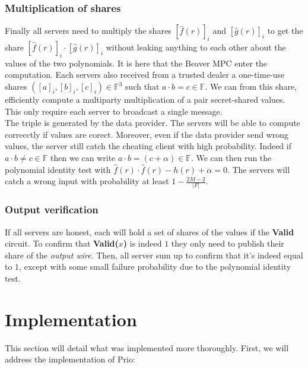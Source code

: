 \documentclass{article}
\begin{document}
\subsubsection{Multiplication of shares}
Finally all servers need to multiply the shares $ [\hat{f}(r)]_i $ and $ [\hat{g}(r)]_i$ to get the share $[\hat{f}(r)]_i \cdot [\hat{g}(r)]_i$ without leaking anything to each other about the values of the two polynomials. It is here that the Beaver MPC enter the computation. Each servers also received from a trusted dealer a one-time-use shares $([a]_i,[b]_i,[c]_i) \in \mathbb{F}^3 $ such that $a \cdot b = c \in \mathbb{F}$. We can from this share, efficiently compute a multiparty multiplication of a pair secret-shared values. This only require each server to broadcast a single message.\\
The triple is generated by the data provider. The servers will be able to compute correcctly if values are corect. Moreover, even if the data provider send wrong values, the server still catch the cheating client with high probability. Indeed if $a \cdot b \neq c \in \mathbb{F}$ then we can write $a \cdot b = (c + \alpha) \in \mathbb{F}$. We can then run the polynomial identity test with $\hat{f}(r) \cdot \hat{f}(r) - h(r) + \alpha = 0$. The servers will catch a wrong input with probability at least $1 - \frac{2M-2}{|F|}$.

\subsubsection{Output verification}
If all servers are honest, each will hold a set of shares of the values if the \textbf{Valid} circuit. To confirm that \textbf{Valid($x$)} is indeed $1$ they only need to publish their share of the \textit{output wire}. Then, all server sum up to confirm that it's indeed equal to $1$, except with some small failure probability due to the polynomial identity test.


\section{Implementation}
 This section will detail what was implemented more thoroughly.
First, we will address the implementation of Prio:\\
\end{document}

